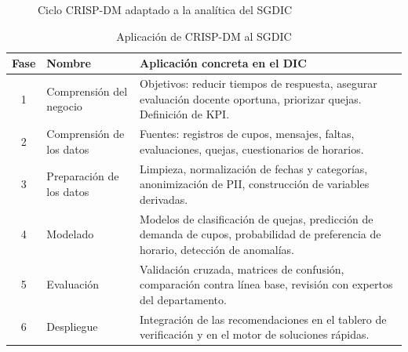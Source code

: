 \begin{figure}[H]
\centering
{}
\caption{Ciclo \ac{CRISP-DM} adaptado a la analítica del \ac{SGDIC}}
\label{fig:crispdm}
\end{figure}

\begin{table}[H]
\centering
\caption{Aplicación de \ac{CRISP-DM} al \ac{SGDIC}}
\label{tab:crispdm}
\small
\begin{tabularx}{\textwidth}{@{}c l X@{}}
\toprule
\rowcolor{verdeClaro}
\textbf{Fase} & \textbf{Nombre} & \textbf{Aplicación concreta en el \ac{DIC}} \\
\midrule
1 & Comprensión del negocio &
    Objetivos: reducir tiempos de respuesta, asegurar evaluación docente
    oportuna, priorizar quejas. Definición de \ac{KPI}. \\
2 & Comprensión de los datos &
    Fuentes: registros de cupos, mensajes, faltas, evaluaciones, quejas,
    cuestionarios de horarios. \\
3 & Preparación de los datos &
    Limpieza, normalización de fechas y categorías, anonimización de \ac{PII},
    construcción de variables derivadas. \\
4 & Modelado &
    Modelos de clasificación de quejas, predicción de demanda de cupos,
    probabilidad de preferencia de horario, detección de anomalías. \\
5 & Evaluación &
    Validación cruzada, matrices de confusión, comparación contra línea base,
    revisión con expertos del departamento. \\
6 & Despliegue &
    Integración de las recomendaciones en el tablero de verificación y en el
    motor de soluciones rápidas. \\
\bottomrule
\end{tabularx}
\end{table}


